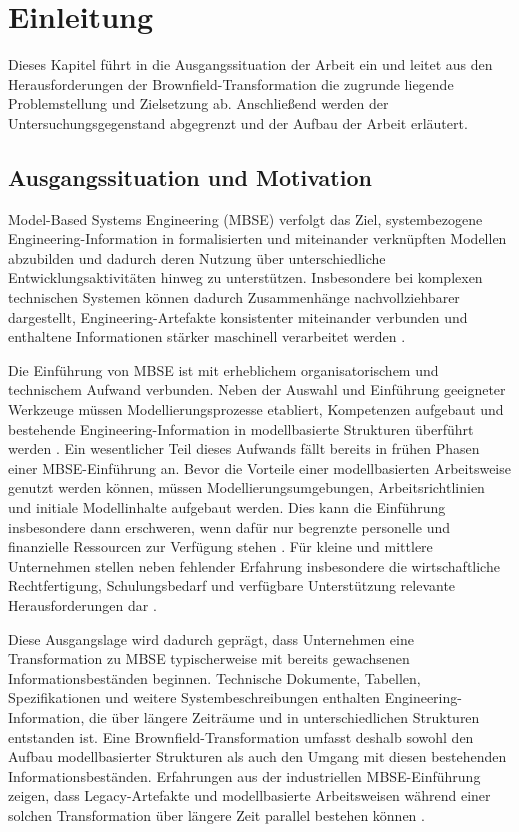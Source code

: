 \section{Einleitung}
\label{sec:einleitung}

Dieses Kapitel führt in die Ausgangssituation der Arbeit ein und leitet aus den
Herausforderungen der Brownfield-Transformation die zugrunde liegende Problemstellung
und Zielsetzung ab. Anschließend werden der Untersuchungsgegenstand abgegrenzt und
der Aufbau der Arbeit erläutert.

\subsection{Ausgangssituation und Motivation}
\label{sec:motivation}

Model-Based Systems Engineering (MBSE) verfolgt das Ziel, systembezogene
Engineering-Information in formalisierten und miteinander verknüpften Modellen
abzubilden und dadurch deren Nutzung über unterschiedliche
Entwicklungsaktivitäten hinweg zu unterstützen. Insbesondere bei komplexen
technischen Systemen können dadurch Zusammenhänge nachvollziehbarer
dargestellt, Engineering-Artefakte konsistenter miteinander verbunden und
enthaltene Informationen stärker maschinell verarbeitet werden
\cite{Hendriks2022,Campo2023}.

Die Einführung von MBSE ist mit erheblichem organisatorischem und technischem
Aufwand verbunden. Neben der Auswahl und Einführung geeigneter Werkzeuge
müssen Modellierungsprozesse etabliert, Kompetenzen aufgebaut und bestehende
Engineering-Information in modellbasierte Strukturen überführt werden
\cite{Call2022,Henderson2024}. Ein wesentlicher Teil dieses Aufwands fällt
bereits in frühen Phasen einer MBSE-Einführung an. Bevor die Vorteile einer
modellbasierten Arbeitsweise genutzt werden können, müssen
Modellierungsumgebungen, Arbeitsrichtlinien und initiale Modellinhalte
aufgebaut werden. Dies kann die Einführung insbesondere dann erschweren,
wenn dafür nur begrenzte personelle und finanzielle Ressourcen zur Verfügung
stehen \cite{Call2022}. Für kleine und mittlere Unternehmen stellen neben
fehlender Erfahrung insbesondere die wirtschaftliche Rechtfertigung,
Schulungsbedarf und verfügbare Unterstützung relevante Herausforderungen dar
\cite{Nanfuka2023}.

Diese Ausgangslage wird dadurch geprägt, dass Unternehmen eine Transformation
zu MBSE typischerweise mit bereits gewachsenen Informationsbeständen
beginnen. Technische Dokumente, Tabellen, Spezifikationen und weitere
Systembeschreibungen enthalten Engineering-Information, die über längere
Zeiträume und in unterschiedlichen Strukturen entstanden ist. Eine
Brownfield-Transformation umfasst deshalb sowohl den Aufbau modellbasierter
Strukturen als auch den Umgang mit diesen bestehenden Informationsbeständen.
Erfahrungen aus der industriellen MBSE-Einführung zeigen, dass
Legacy-Artefakte und modellbasierte Arbeitsweisen während einer solchen
Transformation über längere Zeit parallel bestehen können
\cite{Henderson2024}.

